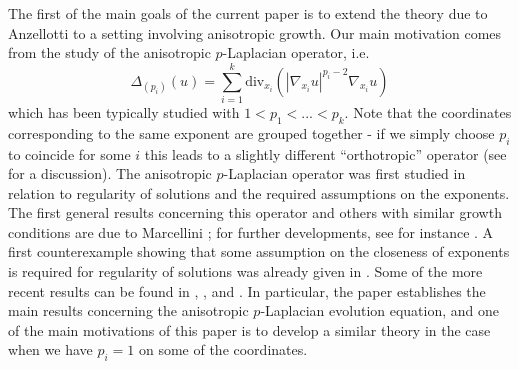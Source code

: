 \documentclass[reqno,12pt]{amsart}
\numberwithin{equation}{section}
\begin{document}
The first of the main goals of the current paper is to extend the theory due to Anzellotti to a setting involving anisotropic growth. Our main motivation comes from the study of the anisotropic $p$-Laplacian operator, i.e.
\begin{equation}
\Delta_{(p_i)}(u) = \sum_{i = 1}^k \mathrm{div}_{x_i} (|\nabla_{x_i} u|^{p_i - 2} \nabla_{x_i} u)
\end{equation}
which has been typically studied with $1 < p_1 < ... < p_k$. Note that the coordinates corresponding to the same exponent are grouped together - if we simply choose $p_i$ to coincide for some $i$ this leads to a slightly different ``orthotropic'' operator (see \cite{FVV} for a discussion). The anisotropic $p$-Laplacian operator was first studied in relation to regularity of solutions and the required assumptions on the exponents. The first general results concerning this operator and others with similar growth conditions are due to Marcellini \cite{Mar1989,Mar1991}; for further developments, see for instance \cite{AF,BGM,BMS,FS}. A first counterexample showing that some assumption on the closeness of exponents is required for regularity of solutions was already given in \cite{Gia1987}. Some of the more recent results can be found in \cite{AdBF}, \cite{AC}, \cite{FVV} and \cite{FGK}. In particular, the paper \cite{FVV} establishes the main results concerning the anisotropic $p$-Laplacian evolution equation, and one of the main motivations of this paper is to develop a similar theory in the case when we have $p_i = 1$ on some of the coordinates.
\end{document}
